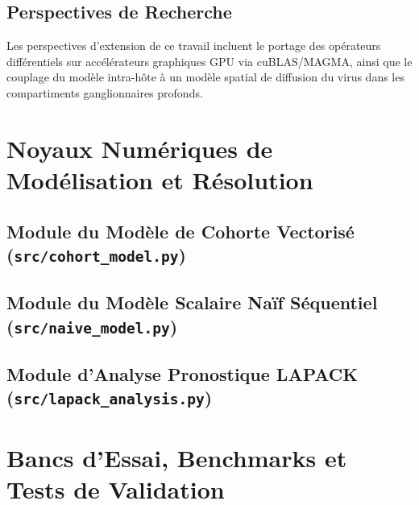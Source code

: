 \documentclass[11pt,a4paper]{report}
\theoremstyle{plain}
\theoremstyle{definition}
\theoremstyle{remark}
\begin{document}
\section*{Perspectives de Recherche}
Les perspectives d'extension de ce travail incluent le portage des opérateurs différentiels sur accélérateurs graphiques GPU via cuBLAS/MAGMA, ainsi que le couplage du modèle intra-hôte à un modèle spatial de diffusion du virus dans les compartiments ganglionnaires profonds.

\appendix

\chapter{Noyaux Numériques de Modélisation et Résolution}

\section[Modèle de Cohorte Vectorisé (cohort\_model.py)]{Module du Modèle de Cohorte Vectorisé\\\large(\texttt{src/cohort\_model.py})}


\newpage
\section[Modèle Scalaire Naïf (naive\_model.py)]{Module du Modèle Scalaire Naïf Séquentiel\\\large(\texttt{src/naive\_model.py})}


\newpage
\section[Analyse Pronostique LAPACK (lapack\_analysis.py)]{Module d'Analyse Pronostique LAPACK\\\large(\texttt{src/lapack\_analysis.py})}


\chapter{Bancs d'Essai, Benchmarks et Tests de Validation}
\end{document}
